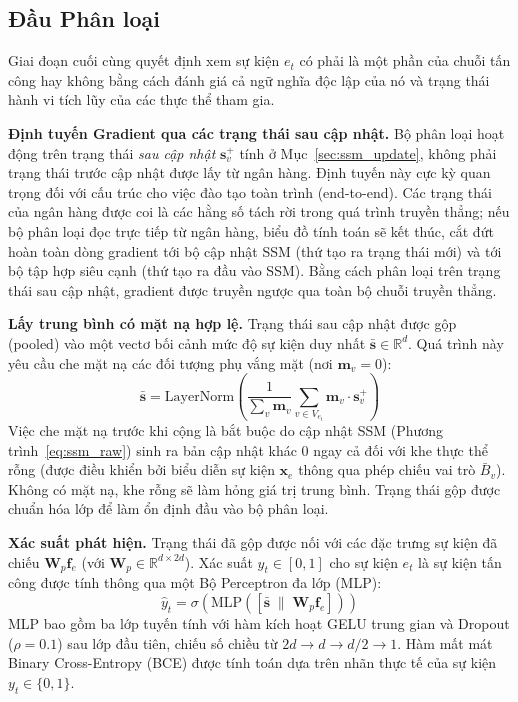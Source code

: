 \documentclass[letterpaper,twocolumn,10pt]{article}
\begin{document}
\subsection{Đầu Phân loại}
\label{sec:classification}

Giai đoạn cuối cùng quyết định xem sự kiện $e_t$ có phải là một phần của chuỗi tấn công hay không bằng cách đánh giá cả ngữ nghĩa độc lập của nó và trạng thái hành vi tích lũy của các thực thể tham gia.

\textbf{Định tuyến Gradient qua các trạng thái sau cập nhật.} Bộ phân loại hoạt động trên trạng thái \emph{sau cập nhật} $\mathbf{s}_v^{+}$ tính ở Mục~\ref{sec:ssm_update}, không phải trạng thái trước cập nhật được lấy từ ngân hàng. Định tuyến này cực kỳ quan trọng đối với cấu trúc cho việc đào tạo toàn trình (end-to-end). Các trạng thái của ngân hàng được coi là các hằng số tách rời trong quá trình truyền thẳng; nếu bộ phân loại đọc trực tiếp từ ngân hàng, biểu đồ tính toán sẽ kết thúc, cắt đứt hoàn toàn dòng gradient tới bộ cập nhật SSM (thứ tạo ra trạng thái mới) và tới bộ tập hợp siêu cạnh (thứ tạo ra đầu vào SSM). Bằng cách phân loại trên trạng thái sau cập nhật, gradient được truyền ngược qua toàn bộ chuỗi truyền thẳng.

\textbf{Lấy trung bình có mặt nạ hợp lệ.} Trạng thái sau cập nhật được gộp (pooled) vào một vectơ bối cảnh mức độ sự kiện duy nhất $\bar{\mathbf{s}} \in \mathbb{R}^d$. Quá trình này yêu cầu che mặt nạ các đối tượng phụ vắng mặt (nơi $\mathbf{m}_v = 0$):
\begin{equation}
    \bar{\mathbf{s}} = \text{LayerNorm}\!\left( \frac{1}{\sum_{v} \mathbf{m}_v} \sum_{v \in V_{e_t}} \mathbf{m}_v \cdot \mathbf{s}_v^{+} \right)
\end{equation}
Việc che mặt nạ trước khi cộng là bắt buộc do cập nhật SSM (Phương trình~\ref{eq:ssm_raw}) sinh ra bản cập nhật khác 0 ngay cả đối với khe thực thể rỗng (được điều khiển bởi biểu diễn sự kiện $\mathbf{x}_e$ thông qua phép chiếu vai trò $\bar{B}_v$). Không có mặt nạ, khe rỗng sẽ làm hỏng giá trị trung bình. Trạng thái gộp được chuẩn hóa lớp để làm ổn định đầu vào bộ phân loại.

\textbf{Xác suất phát hiện.} Trạng thái đã gộp được nối với các đặc trưng sự kiện đã chiếu $\mathbf{W}_p \mathbf{f}_e$ (với $\mathbf{W}_p \in \mathbb{R}^{d \times 2d}$). Xác suất $\hat{y}_t \in [0, 1]$ cho sự kiện $e_t$ là sự kiện tấn công được tính thông qua một Bộ Perceptron đa lớp (MLP):
\begin{equation}
    \hat{y}_t = \sigma\!\left( \text{MLP}\!\left(\left[\bar{\mathbf{s}} \;\|\; \mathbf{W}_p \mathbf{f}_e\right]\right) \right)
\end{equation}
MLP bao gồm ba lớp tuyến tính với hàm kích hoạt GELU trung gian và Dropout ($\rho=0.1$) sau lớp đầu tiên, chiếu số chiều từ $2d \to d \to d/2 \to 1$. Hàm mất mát Binary Cross-Entropy (BCE) được tính toán dựa trên nhãn thực tế của sự kiện $y_t \in \{0, 1\}$.
\end{document}
